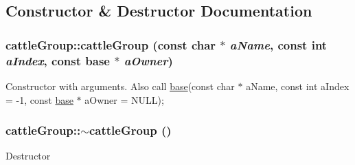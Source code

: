 \subsection{Constructor \& Destructor Documentation}
\hypertarget{classcattle_group_a102bb5873e737914585e0e224df5af39}{
\subsubsection[{cattleGroup}]{\setlength{\rightskip}{0pt plus 5cm}cattleGroup::cattleGroup (const char $\ast$ {\em aName}, \/  const int {\em aIndex}, \/  const {\bf base} $\ast$ {\em aOwner})}}
\label{classcattle_group_a102bb5873e737914585e0e224df5af39}
Constructor with arguments. Also call \hyperlink{classbase}{base}(const char $\ast$ aName, const int aIndex = -\/1, const \hyperlink{classbase}{base} $\ast$ aOwner = NULL); \hypertarget{classcattle_group_a219cd352f81d78c80e2db2db42115759}{
\subsubsection[{$\sim$cattleGroup}]{\setlength{\rightskip}{0pt plus 5cm}cattleGroup::$\sim$cattleGroup ()}}
\label{classcattle_group_a219cd352f81d78c80e2db2db42115759}
Destructor 

